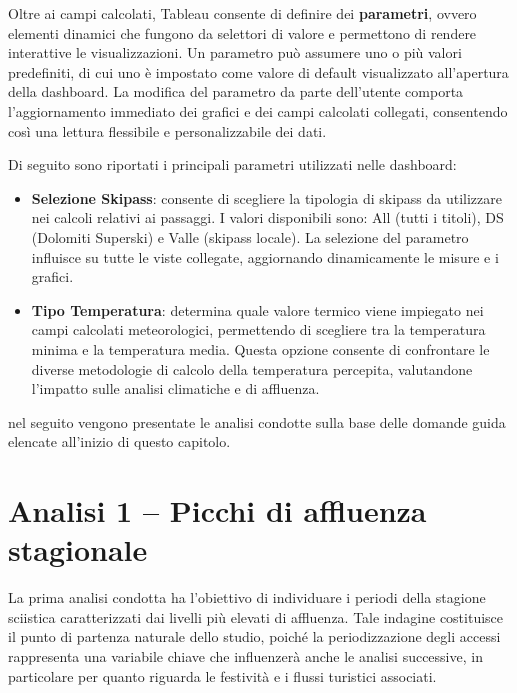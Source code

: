 Oltre ai campi calcolati, Tableau consente di definire dei \textbf{parametri}, ovvero elementi dinamici che fungono da selettori di valore e permettono di rendere interattive le visualizzazioni.  
Un parametro può assumere uno o più valori predefiniti, di cui uno è impostato come valore di default visualizzato all’apertura della dashboard.  
La modifica del parametro da parte dell’utente comporta l’aggiornamento immediato dei grafici e dei campi calcolati collegati, consentendo così una lettura flessibile e personalizzabile dei dati.

Di seguito sono riportati i principali parametri utilizzati nelle dashboard:

\begin{itemize}
    \item \textbf{Selezione Skipass}: consente di scegliere la tipologia di skipass da utilizzare nei calcoli relativi ai passaggi.  
    I valori disponibili sono: All (tutti i titoli), DS (Dolomiti Superski) e Valle (skipass locale).  
    La selezione del parametro influisce su tutte le viste collegate, aggiornando dinamicamente le misure e i grafici.
    
    \item \textbf{Tipo Temperatura}: determina quale valore termico viene impiegato nei campi calcolati meteorologici, permettendo di scegliere tra la temperatura minima e la temperatura media.  
    Questa opzione consente di confrontare le diverse metodologie di calcolo della temperatura percepita, valutandone l’impatto sulle analisi climatiche e di affluenza.
\end{itemize}

nel seguito vengono presentate le analisi condotte sulla base delle domande guida elencate all'inizio di questo capitolo.


\section{Analisi 1 – Picchi di affluenza stagionale}\label{sec:analisi1}

La prima analisi condotta ha l’obiettivo di individuare i periodi della stagione sciistica caratterizzati dai livelli più elevati di affluenza. Tale indagine costituisce il punto di partenza naturale dello studio, poiché la periodizzazione degli accessi rappresenta una variabile chiave che influenzerà anche le analisi successive, in particolare per quanto riguarda le festività e i flussi turistici associati.\\

